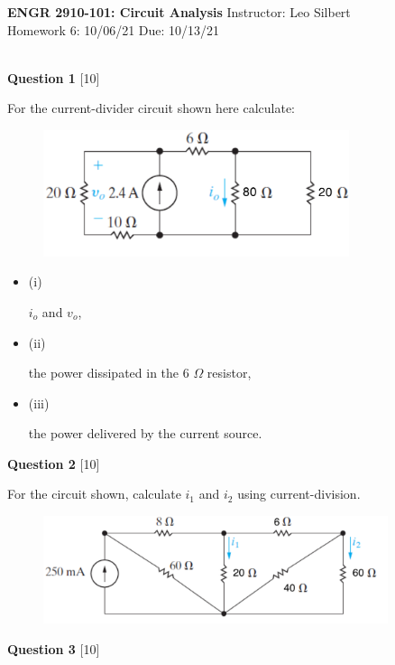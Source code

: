 \documentclass[12pt]{article}
\newcommand{\bit}{\begin{itemize}}
\newcommand{\eit}{\end{itemize}}
\begin{document}

\begin{center}
\hfil
{\large\bf {ENGR 2910-101: Circuit Analysis}}
\hfill Instructor: Leo Silbert \\
Homework 6: 10/06/21 \hfill Due: 10/13/21\\
\hrulefill\\
\end{center}




\noindent
{\bf Question 1} [10]

For the current-divider circuit shown here calculate:
\begin{figure}[h!]
  \centering 
 \vspace{-0.1in}
 \includegraphics[clip,width=0.8\textwidth]{Fig3-19.png}
\end{figure}

\bit

\item[(i)]

$i_{o}$ and $v_{o}$,

\item[(ii)]

the power dissipated in the 6 $\Omega$ resistor,

\item[(iii)]

the power delivered by the current source.

\eit

\vspace{0.1in}
\noindent
{\bf Question 2} [10]

For the circuit shown, calculate $i_{1}$ and $i_{2}$ using current-division.
\begin{figure}[h!]
     \centering
\vspace{-0.1in}
     \includegraphics[clip,width=0.9\textwidth]{Fig3-29.png}
\vspace{-0.15in}
\end{figure}
 \newpage
\noindent
{\bf Question 3} [10]
\end{document}
